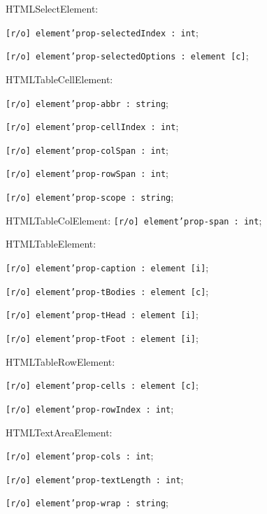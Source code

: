 \begin{icItems}
	\item HTMLSelectElement:
	\begin{icItems}
		\item \texttt{[r/o] element'prop-selectedIndex : int};
		\item \texttt{[r/o] element'prop-selectedOptions : element [c]};
	\end{icItems}
	
	\item HTMLTableCellElement:
	\begin{icItems}
		\item \texttt{[r/o] element'prop-abbr : string};
		\item \texttt{[r/o] element'prop-cellIndex : int};
		\item \texttt{[r/o] element'prop-colSpan : int};
		\item \texttt{[r/o] element'prop-rowSpan : int};
		\item \texttt{[r/o] element'prop-scope : string};
	\end{icItems}
	
	\item HTMLTableColElement: \texttt{[r/o] element'prop-span : int};
	
	\item HTMLTableElement:
	\begin{icItems}
		\item \texttt{[r/o] element'prop-caption : element [i]};
		\item \texttt{[r/o] element'prop-tBodies : element [c]};
		\item \texttt{[r/o] element'prop-tHead : element [i]};
		\item \texttt{[r/o] element'prop-tFoot : element [i]};
	\end{icItems}
	
	\item HTMLTableRowElement:
	\begin{icItems}
		\item \texttt{[r/o] element'prop-cells : element [c]};
		\item \texttt{[r/o] element'prop-rowIndex : int};
	\end{icItems}
	
	\item HTMLTextAreaElement:
	\begin{icItems}
		\item \texttt{[r/o] element'prop-cols : int};
		\item \texttt{[r/o] element'prop-textLength : int};
		\item \texttt{[r/o] element'prop-wrap : string};
	\end{icItems}
	

\end{icItems}
